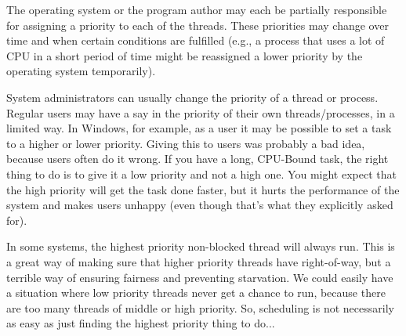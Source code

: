 The operating system or the program author may each be partially responsible for assigning a priority to each of the threads. These priorities may change over time and when certain conditions are fulfilled (e.g., a process that uses a lot of CPU in a short period of time might be reassigned a lower priority by the operating system temporarily).

System administrators can usually change the priority of a thread or process. Regular users may have a say in the priority of their own threads/processes, in a limited way. In Windows, for example, as a user it may be possible to set a task to a higher or lower priority. Giving this to users was probably a bad idea, because users often do it wrong. If you have a long, CPU-Bound task, the right thing to do is to give it a low priority and not a high one. You might expect that the high priority will get the task done faster, but it hurts the performance of the system and makes users unhappy (even though that's what they explicitly asked for).

In some systems, the highest priority non-blocked thread will always run. This is a great way of making sure that higher priority threads have right-of-way, but a terrible way of ensuring fairness and preventing starvation. We could easily have a situation where low priority threads never get a chance to run, because there are too many threads of middle or high priority. So, scheduling is not necessarily as easy as just finding the highest priority thing to do...




